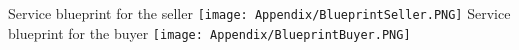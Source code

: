 \begin{center}
Service blueprint for the seller
\texttt{[image: Appendix/BlueprintSeller.PNG]}
Service blueprint for the buyer
\texttt{[image: Appendix/BlueprintBuyer.PNG]}
\end{center}
